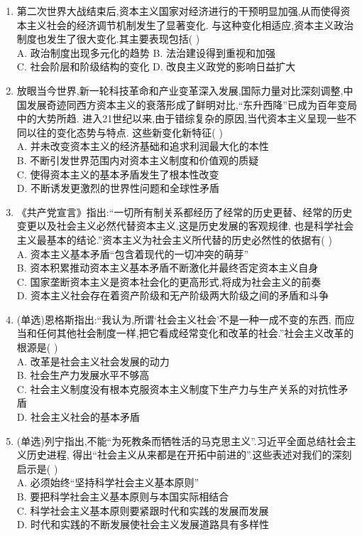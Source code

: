 \documentclass[12pt, a4paper, oneside, UTF8]{ctexbook}
\begin{document}
\begin{enumerate}
    \item 第二次世界大战结束后,资本主义国家对经济进行的干预明显加强,从而使得资本主义社会的经济调节机制发生了显著变化.
    与这种变化相适应,资本主义政治制度也发生了很大变化.其主要表现包括(   ) \\
    A. 政治制度出现多元化的趋势 \qquad
    B. 法治建设得到重视和加强 \\
    C. 社会阶层和阶级结构的变化 \qquad
    D. 改良主义政党的影响日益扩大

    \item 放眼当今世界,新一轮科技革命和产业变革深入发展,国际力量对比深刻调整,中国发展奇迹同西方资本主义的衰落形成了鲜明对比,“东升西降”已成为百年变局中的大势所趋.
    进入21世纪以来,由于错综复杂的原因,当代资本主义呈现一些不同以往的变化态势与特点.
    这些新变化新特征(   ) \\
    A. 并未改变资本主义的经济基础和追求利润最大化的本性\\
    B. 不断引发世界范围内对资本主义制度和价值观的质疑\\
    C. 使得资本主义的基本矛盾发生了根本性改变\\
    D. 不断诱发更激烈的世界性问题和全球性矛盾

    \item 《共产党宣言》指出:“一切所有制关系都经历了经常的历史更替、经常的历史变更以及社会主义必然代替资本主义,这是历史发展的客观规律,
    也是科学社会主义最基本的结论.”资本主义为社会主义所代替的历史必然性的依据有(   ) \\
    A. 资本主义基本矛盾“包含着现代的一切冲突的萌芽” \\
    B. 资本积累推动资本主义基本矛盾不断激化并最终否定资本主义自身 \\
    C. 国家垄断资本主义是资本社会化的更高形式,将成为社会主义的前奏 \\
    D. 资本主义社会存在着资产阶级和无产阶级两大阶级之间的矛盾和斗争

    \item (单选)恩格斯指出:“我认为,所谓‘社会主义社会’不是一种一成不变的东西,
    而应当和任何其他社会制度一样,把它看成经常变化和改革的社会.”社会主义改革的根源是(   ) \\
    A. 改革是社会主义社会发展的动力 \\
    B. 社会生产力发展水平不够高 \\
    C. 社会主义制度没有根本克服资本主义制度下生产力与生产关系的对抗性矛盾 \\
    D. 社会主义社会的基本矛盾 

    \item (单选)列宁指出,不能“为死教条而牺牲活的马克思主义”.习近平全面总结社会主义历史进程,
    得出“社会主义从来都是在开拓中前进的”.这些表述对我们的深刻启示是(   ) \\
    A. 必须始终“坚持科学社会主义基本原则” \\
    B. 要把科学社会主义基本原则与本国实际相结合 \\
    C. 科学社会主义基本原则要紧跟时代和实践的发展而发展 \\
    D. 时代和实践的不断发展使社会主义发展道路具有多样性


\end{enumerate}
\end{document}

